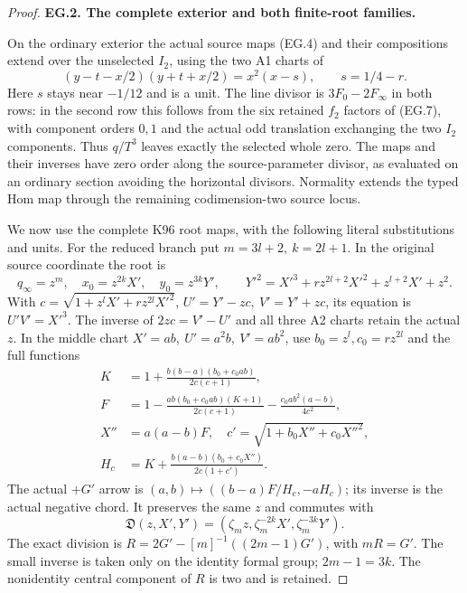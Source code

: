 \begin{proof}
\par\medskip\noindent\textbf{EG.2. The complete exterior and both finite-root families.}\par\nopagebreak[4]

On the ordinary exterior the actual source maps (EG.4) and
their compositions extend over the unselected \(I_2\), using
the two A1 charts of
\[
 (y-t-x/2)(y+t+x/2)=x^2(x-s),\qquad s=1/4-r .
 \tag{EG.17}
\]
Here \(s\) stays near \(-1/12\) and is a unit. The line
divisor is \(3F_0-2F_\infty\) in both rows: in the second
row this follows from the six retained \(f_2\) factors of
(EG.7), with component orders \(0,1\) and the actual odd
translation exchanging the two \(I_2\) components. Thus
\(q/T^3\) leaves exactly the selected whole zero. The maps
and their inverses have zero order along the source-parameter
divisor, as evaluated on an ordinary section avoiding the
horizontal divisors. Normality extends the typed Hom map
through the remaining codimension-two source locus.

We now use the complete K96 root maps, with the following
literal substitutions and units. For the reduced branch put
\(m=3l+2,\ k=2l+1\). In the original source coordinate the root is
\[
 q_\infty=z^m,\quad x_0=z^{2k}X',\quad y_0=z^{3k}Y',
 \qquad
 Y'^2=X'^3+r z^{2l+2}X'^2+z^{l+2}X'+z^2 .
 \tag{EG.18}
\]
With \(c=\sqrt{1+z^lX'+r z^{2l}X'^2}\),
\(U'=Y'-zc,\ V'=Y'+zc\), its equation is \(U'V'=X'^3\).
The inverse of \(2zc=V'-U'\) and all three A2 charts retain
the actual \(z\). In the middle chart \(X'=ab,\ U'=a^2b,\
V'=ab^2\), use \(b_0=z^l,c_0=r z^{2l}\) and the full functions
\[
 \begin{split}
 K&=1+\frac{b(b-a)(b_0+c_0ab)}{2c(c+1)},\\
 F&=1-\frac{ab(b_0+c_0ab)(K+1)}{2c(c+1)}
             -\frac{c_0ab^2(a-b)}{4c^2},\\
 X''&=a(a-b)F,\quad c'=\sqrt{1+b_0X''+c_0X''^2},\\
 H_c&=K+\frac{b(a-b)(b_0+c_0X'')}{2c(1+c')}.
 \end{split}
 \tag{EG.19}
\]
The actual \(+G'\) arrow is
\((a,b)\mapsto((b-a)F/H_c,-aH_c)\); its inverse is the
actual negative chord. It preserves the same \(z\) and
commutes with
\[
 {\mathfrak D}(z,X',Y')
   =(\zeta_mz,\zeta_m^{-2k}X',\zeta_m^{-3k}Y').
 \tag{EG.20}
\]
The exact division is
\(R=2G'-[m]^{-1}((2m-1)G')\), with \(mR=G'\).
The small inverse is taken only on the identity formal
group; \(2m-1=3k\). The nonidentity central component of
\(R\) is two and is retained.


\end{proof}
